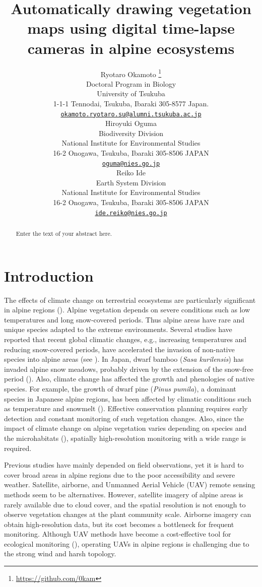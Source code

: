 \documentclass{article}
\title{Automatically drawing vegetation maps using digital time-lapse cameras in alpine ecosystems}
\author{
    Ryotaro Okamoto
    \thanks{\url{https://github.com/0kam}}
   \\
    Doctoral Program in Biology \\
    University of Tsukuba \\
  1-1-1 Tennodai, Tsukuba, Ibaraki 305-8577 Japan. \\
  \texttt{\href{mailto:okamoto.ryotaro.su@alumni.tsukuba.ac.jp}{\nolinkurl{okamoto.ryotaro.su@alumni.tsukuba.ac.jp}}} \\
   \And
    Hiroyuki Oguma
   \\
    Biodiversity Division \\
    National Institute for Environmental Studies \\
  16-2 Onogawa, Tsukuba, Ibaraki 305-8506 JAPAN \\
  \texttt{\href{mailto:oguma@nies.go.jp}{\nolinkurl{oguma@nies.go.jp}}} \\
   \And
    Reiko Ide
   \\
    Earth System Division \\
    National Institute for Environmental Studies \\
  16-2 Onogawa, Tsukuba, Ibaraki 305-8506 JAPAN \\
  \texttt{\href{mailto:ide.reiko@nies.go.jp}{\nolinkurl{ide.reiko@nies.go.jp}}} \\
  }
\begin{document}
\maketitle


\begin{abstract}
Enter the text of your abstract here.
\end{abstract}


\hypertarget{introduction}{%
\section{Introduction}\label{introduction}}

The effects of climate change on terrestrial ecosystems are particularly significant in alpine regions (\cite{IPCC2007}). Alpine vegetation depends on severe conditions such as low temperatures and long snow-covered periods. Thus alpine areas have rare and unique species adapted to the extreme environments. Several studies have reported that recent global climatic changes, e.g., increasing temperatures and reducing snow-covered periods, have accelerated the invasion of non-native species into alpine areas (see \cite{Alexander2016AlpBotany}). In Japan, dwarf bamboo (\emph{Sasa kurilensis}) has invaded alpine snow meadows, probably driven by the extension of the snow-free period (\cite{Kudo2011EcoEvo}). Also, climate change has affected the growth and phenologies of native species. For example, the growth of dwarf pine (\emph{Pinus pumila}), a dominant species in Japanese alpine regions, has been affected by climatic conditions such as temperature and snowmelt (\cite{Amagai2015EcoRes}). Effective conservation planning requires early detection and constant monitoring of such vegetation changes. Also, since the impact of climate change on alpine vegetation varies depending on species and the microhabitats (\cite{Kudo2010AAA}), spatially high-resolution monitoring with a wide range is required.

Previous studies have mainly depended on field observations, yet it is hard to cover broad areas in alpine regions due to the poor accessibility and severe weather. Satellite, airborne, and Unmanned Aerial Vehicle (UAV) remote sensing methods seem to be alternatives. However, satellite imagery of alpine areas is rarely available due to cloud cover, and the spatial resolution is not enough to observe vegetation changes at the plant community scale. Airborne imagery can obtain high-resolution data, but its cost becomes a bottleneck for frequent monitoring. Although UAV methods have become a cost-effective tool for ecological monitoring (\cite{Baena2017PLOSONE}), operating UAVs in alpine regions is challenging due to the strong wind and harsh topology.
\end{document}
